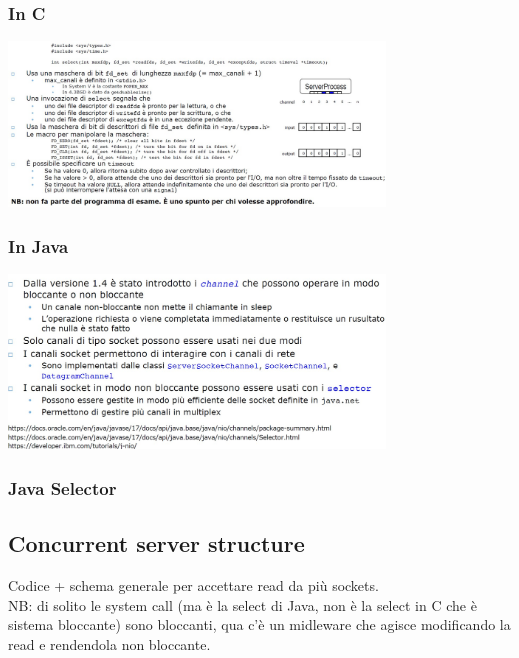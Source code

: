 \subsubsection{In C}
\begin{center}
    \includegraphics[width=0.75\textwidth]{img/SelectSystemCall_C1.jpg}
\end{center}

\subsubsection{In Java}
\begin{center}
    \includegraphics[width=0.75\textwidth]{img/SelectSystemCall_Java1.jpg}
\end{center}

\subsubsection{Java Selector}

\subsection{Concurrent server structure}
Codice + schema generale per accettare read da più sockets.
\\NB: di solito le system call (ma è la select di Java, non è la select in C che è sistema bloccante) sono bloccanti, qua c'è un midleware che agisce modificando la read e rendendola non bloccante.

